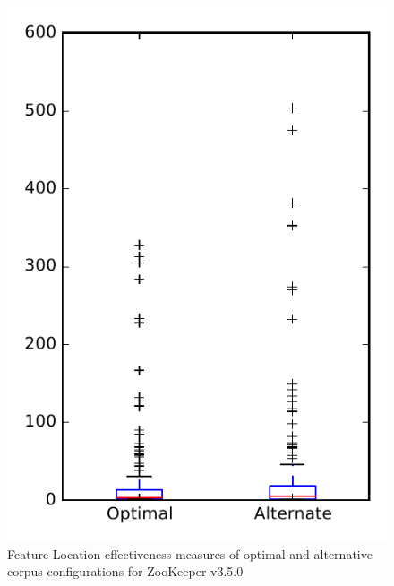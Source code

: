 
\begin{figure}
\centering
\includegraphics[height=0.4\textheight]{figures/combo/flt_rq2_zookeeper}
\caption{Feature Location effectiveness measures of optimal and alternative corpus configurations for ZooKeeper v3.5.0}
\label{fig:combo:flt:rq2:zookeeper}
\end{figure}
